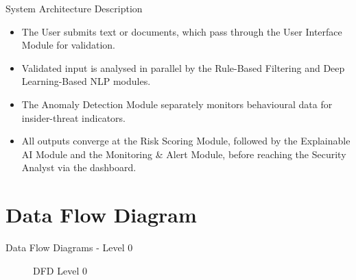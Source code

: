 \documentclass{beamer}
\begin{document}
\begin{frame}{System Architecture Description}
\begin{itemize}
  \item The User submits text or documents, which pass through the User Interface Module for validation.
  \item Validated input is analysed in parallel by the Rule-Based Filtering and Deep Learning-Based NLP modules.
  \item The Anomaly Detection Module separately monitors behavioural data for insider-threat indicators.
  \item All outputs converge at the Risk Scoring Module, followed by the Explainable AI Module and the Monitoring \& Alert Module, before reaching the Security Analyst via the dashboard.
\end{itemize}
\end{frame}

\section{Data Flow Diagram}
\begin{frame}{Data Flow Diagrams - Level 0}
\begin{figure}
\centering
{}
\caption{DFD Level 0}
\end{figure}
\end{frame}
\end{document}

